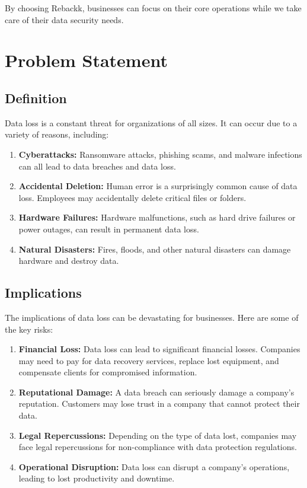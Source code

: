 \documentclass[12pt]{article}
\begin{document}
By choosing Rebackk, businesses can focus on their core operations while we take care of their data security needs.

\newpage

\section{Problem Statement}

\subsection{Definition}

Data loss is a constant threat for organizations of all sizes. It can occur due to a variety of reasons, including:

\begin{enumerate}
    \item \textbf{Cyberattacks:} Ransomware attacks, phishing scams, and malware infections can all lead to data breaches and data loss.
    \item \textbf{Accidental Deletion:} Human error is a surprisingly common cause of data loss. Employees may accidentally delete critical files or folders.
    \item \textbf{Hardware Failures:} Hardware malfunctions, such as hard drive failures or power outages, can result in permanent data loss.
    \item \textbf{Natural Disasters:} Fires, floods, and other natural disasters can damage hardware and destroy data.
\end{enumerate}

\subsection{Implications}

The implications of data loss can be devastating for businesses. Here are some of the key risks:

\begin{enumerate}
    \item \textbf{Financial Loss:} Data loss can lead to significant financial losses. Companies may need to pay for data recovery services, replace lost equipment, and compensate clients for compromised information.
    \item \textbf{Reputational Damage:} A data breach can seriously damage a company's reputation. Customers may lose trust in a company that cannot protect their data.
    \item \textbf{Legal Repercussions:} Depending on the type of data lost, companies may face legal repercussions for non-compliance with data protection regulations.
    \item \textbf{Operational Disruption:} Data loss can disrupt a company's operations, leading to lost productivity and downtime.
\end{enumerate}
\end{document}
